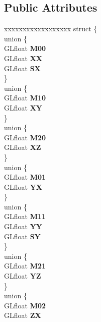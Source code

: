 \subsection*{Public Attributes}
\begin{DoxyCompactItemize}
\item 
\begin{tabbing}
xx\=xx\=xx\=xx\=xx\=xx\=xx\=xx\=xx\=\kill
struct \{\\
\>union \{\\
\>\>GLfloat {\bfseries M00}\\
\>\>GLfloat {\bfseries XX}\\
\>\>GLfloat {\bfseries SX}\\
\>\} \label{structMatrix3f__t_1_1@3_a2ae4591bf6633cb549324f306dbb677a}
\\
\>union \{\\
\>\>GLfloat {\bfseries M10}\\
\>\>GLfloat {\bfseries XY}\\
\>\} \label{structMatrix3f__t_1_1@3_a26e557035ad01cad1cb2531150dbb028}
\\
\>union \{\\
\>\>GLfloat {\bfseries M20}\\
\>\>GLfloat {\bfseries XZ}\\
\>\} \label{structMatrix3f__t_1_1@3_acf78e2bf0837f3419d61c6f06223294f}
\\
\>union \{\\
\>\>GLfloat {\bfseries M01}\\
\>\>GLfloat {\bfseries YX}\\
\>\} \label{structMatrix3f__t_1_1@3_a381e452a2eaf236daf8de75bf6929b24}
\\
\>union \{\\
\>\>GLfloat {\bfseries M11}\\
\>\>GLfloat {\bfseries YY}\\
\>\>GLfloat {\bfseries SY}\\
\>\} \label{structMatrix3f__t_1_1@3_aa6447d373eb786d59b2642498b2372f9}
\\
\>union \{\\
\>\>GLfloat {\bfseries M21}\\
\>\>GLfloat {\bfseries YZ}\\
\>\} \label{structMatrix3f__t_1_1@3_ab4be56b97e88354ddb473198929acac5}
\\
\>union \{\\
\>\>GLfloat {\bfseries M02}\\
\>\>GLfloat {\bfseries ZX}\\

\end{tabbing}
\end{DoxyCompactItemize}
